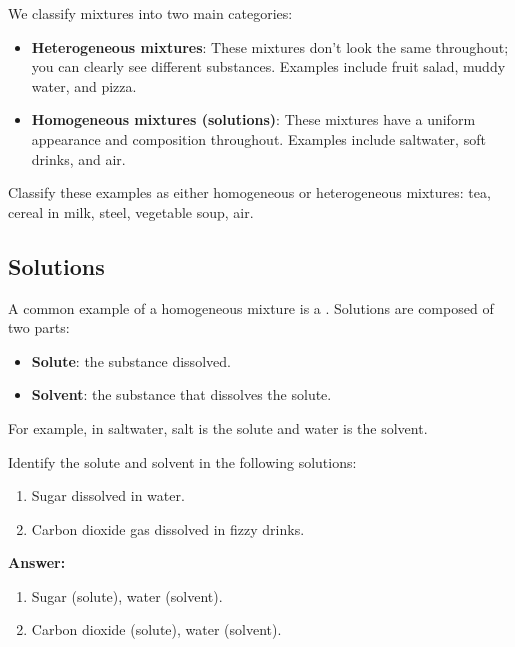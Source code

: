 We classify mixtures into two main categories:

\begin{itemize}
\item \textbf{Heterogeneous mixtures}: These mixtures don't look the same throughout; you can clearly see different substances. Examples include fruit salad, muddy water, and pizza.
\item \textbf{Homogeneous mixtures (solutions)}: These mixtures have a uniform appearance and composition throughout. Examples include saltwater, soft drinks, and air.
\end{itemize}

\begin{stopandthink}
Classify these examples as either homogeneous or heterogeneous mixtures: tea, cereal in milk, steel, vegetable soup, air.
\end{stopandthink}

\subsection{Solutions}

A common example of a homogeneous mixture is a . Solutions are composed of two parts:

\begin{itemize}
\item \textbf{Solute}: the substance dissolved.
\item \textbf{Solvent}: the substance that dissolves the solute.
\end{itemize}

For example, in saltwater, salt is the solute and water is the solvent.

\begin{example}
Identify the solute and solvent in the following solutions:
\begin{enumerate}
\item Sugar dissolved in water.
\item Carbon dioxide gas dissolved in fizzy drinks.
\end{enumerate}

\textbf{Answer:}
\begin{enumerate}
\item Sugar (solute), water (solvent).
\item Carbon dioxide (solute), water (solvent).
\end{enumerate}
\end{example}

